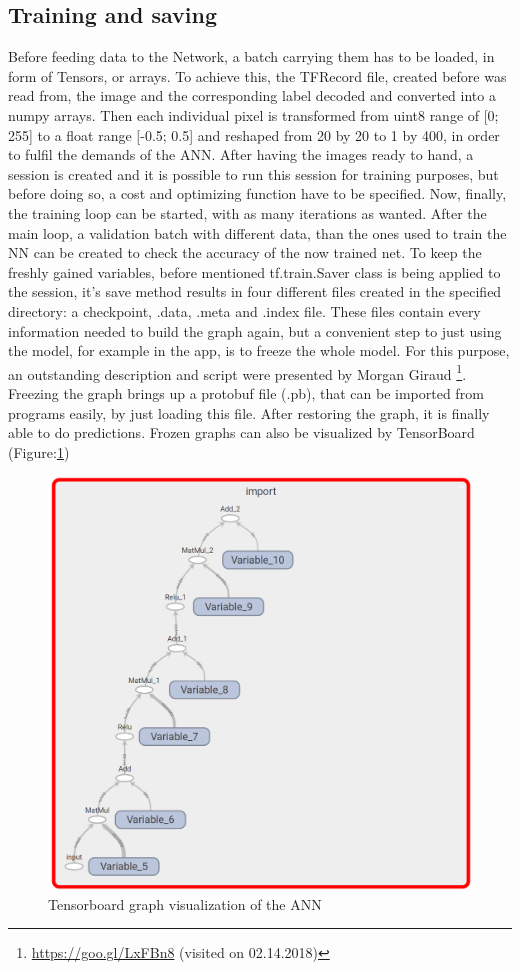 \subsection{Training and saving}
Before feeding data to the Network, a batch carrying them has to be loaded, in form of Tensors, or arrays. To achieve this, the TFRecord file, created before was read from, the image and the corresponding label decoded and converted into a numpy arrays. Then each individual pixel is transformed from uint8 range of [0; 255] to a float range [-0.5; 0.5] and reshaped from 20 by 20 to 1 by 400, in order to fulfil the demands of the ANN. After having the images ready to hand, a session is created and it is possible to run this session for training purposes, but before doing so, a cost and optimizing function have to be specified. Now, finally, the training loop can be started, with as many iterations as wanted. After the main loop, a validation batch with different data, than the ones used to train the NN can be created to check the accuracy of the now trained net. \newline
To keep the freshly gained variables, before mentioned tf.train.Saver  class is being applied to the session, it's save method results in four different files created in the specified directory: a checkpoint, .data, .meta and .index file. These files contain every information needed to build the graph again, but a convenient step to just using the model, for example in the app, is to freeze the whole model. For this purpose, an outstanding description and script were presented by Morgan Giraud \footnote{\url{https://goo.gl/LxFBn8} (visited on 02.14.2018)}. Freezing the graph brings up a protobuf file (.pb), that can be imported from programs easily, by just loading this file. After restoring the graph, it is finally able to do predictions. Frozen graphs can also be visualized by TensorBoard (Figure:\ref{fig:tensorboard})


\begin{figure}[H]
	\centering
	\includegraphics[width=0.7\linewidth]{images/tensorboard.png}
	\caption{Tensorboard graph visualization of the ANN}\label{fig:tensorboard}
\end{figure}

